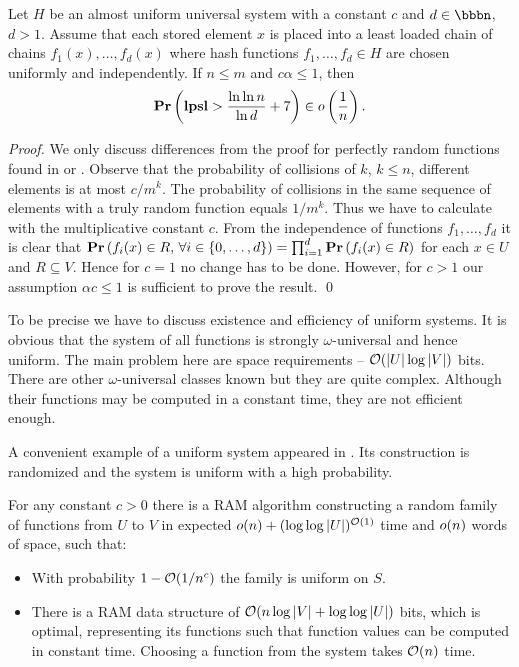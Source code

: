 \begin{theorem}
\label{theorem-universal-hashing-two-choices}
Let $H$ be an almost uniform universal system with a constant $c$ and $d \in \bbbn$, $d > 1$. Assume that each stored element $x$ is placed into a least loaded chain of chains $f_1(x), \dots, f_d(x)$ where hash functions $f_1, \dots, f_d \in H$ are chosen uniformly and independently. If $n \leq m$ and $c \alpha \leq 1$, then $$\mathbf{Pr}\left(\mathbf{lpsl} > \frac{\ln \ln n}{\ln d} + 7\right) \in o\left(\frac{1}{n}\right).$$
\end{theorem}
\begin{proof}
We only discuss differences from the proof for perfectly random functions found in \cite{Mitzenmacher:2005:PCR:1076315} or \cite{DBLP:conf/stoc/AzarBKU94}. Observe that the probability of collisions of $k$, $k \leq n$, different elements is at most ${c}/{m^k}$. The probability of collisions in the same sequence of elements with a truly random function equals ${1}/{m^k}$. Thus we have to calculate with the multiplicative constant $c$.
From the independence of functions $f_1, \dots, f_d$ it is clear that $\mathbf{Pr}\left(f_i(x) \in R,\, \forall i \in \{0, \dots, d\}\right) = \prod_{i = 1}^{d}\mathbf{Pr}\left(f_i(x) \in R\right)$ for each $x \in U$ and $R \subseteq V$. Hence for $c = 1$ no change has to be done. However, for $c > 1$ our assumption $\alpha c \leq 1$ is sufficient to prove the result.
\qed
\end{proof}

To be precise we have to discuss existence and efficiency of uniform systems. It is obvious that the system of all functions is strongly $\omega$-universal and hence uniform. The main problem here are space requirements -- $\mathcal{O}(|U| \log |V|)$ bits. There are other $\omega$-universal classes known but they are quite complex. Although their functions may be computed in a constant time, they are not efficient enough. 

A convenient example of a uniform system appeared in \cite{DBLP:journals/siamcomp/PaghP08}. Its construction is randomized and the system is uniform with a high probability.
\begin{theorem}
\label{theorem-uniform-system}
For any constant $c > 0$ there is a RAM algorithm constructing a random family of functions from $U$ to $V$ in expected $o(n) + (\log \log|U|)^{\mathcal{O}(1)}$ time and $o(n)$ words of space, such that:
\begin{itemize}
\item With probability $1 - \mathcal{O}(1 / n^c)$ the family is uniform on $S$.
\item There is a RAM data structure of $\mathcal{O}(n \log|V| + \log \log|U|)$ bits, which is optimal, representing its functions such that function values can be computed in constant time. Choosing a function from the system takes $\mathcal{O}(n)$ time.
\end{itemize}
\end{theorem}

